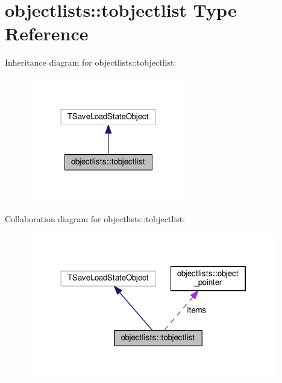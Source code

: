 \hypertarget{structobjectlists_1_1tobjectlist}{}\section{objectlists\+:\+:tobjectlist Type Reference}
\label{structobjectlists_1_1tobjectlist}


Inheritance diagram for objectlists\+:\+:tobjectlist\+:
\nopagebreak
\begin{figure}[H]
\begin{center}
\leavevmode
\includegraphics[width=198pt]{structobjectlists_1_1tobjectlist__inherit__graph}
\end{center}
\end{figure}


Collaboration diagram for objectlists\+:\+:tobjectlist\+:
\nopagebreak
\begin{figure}[H]
\begin{center}
\leavevmode
\includegraphics[width=309pt]{structobjectlists_1_1tobjectlist__coll__graph}
\end{center}
\end{figure}

